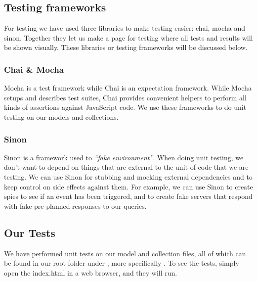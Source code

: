 \subsection{Testing frameworks}
For testing we have used three libraries to make testing easier: chai, mocha and sinon. Together they let us make a page for testing where all tests and results will be shown visually.
These libraries or testing frameworks will be discussed below.
\subsubsection{Chai \& Mocha}
Mocha\cite{web_8} is a test framework while Chai\cite{web_7} is an expectation framework. While Mocha setups and describes test suites, Chai provides convenient helpers to perform all kinds of assertions against JavaScript code. We use these frameworks to do unit testing on our models and collections.

\subsubsection{Sinon}
Sinon\cite{web_9} is a framework used to \textit{“fake environment”}. When doing unit testing, we don’t want to depend on things that are external to the unit of code that we are testing. We can use Sinon for stubbing and mocking external dependencies and to keep control on side effects against them. For example, we can use Sinon to create spies to see if an event has been triggered, and to create fake servers that respond with fake pre-planned responses to our queries.
\subsection{Our Tests}
We have performed unit tests on our model and collection files, all of which can be found in our root folder under , more specifically . To see the tests, simply open the index.html in a web browser, and they will run.
